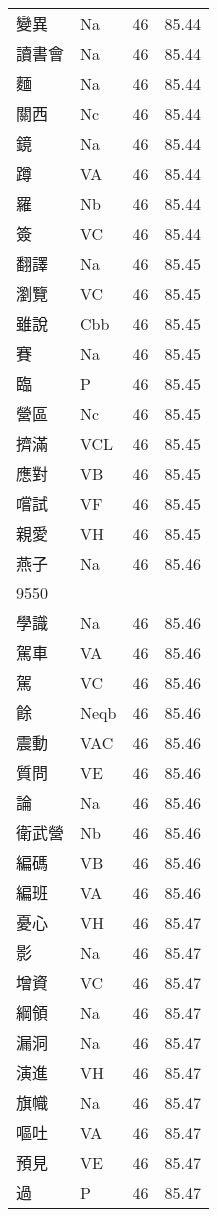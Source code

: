 \documentclass[twocolumn]{book}
\begin{document}
\begin{supertabular}{llrr}
變異 & Na & 46 &  85.44\\
讀書會 & Na & 46 &  85.44\\
麵 & Na & 46 &  85.44\\
關西 & Nc & 46 &  85.44\\
鏡 & Na & 46 &  85.44\\
蹲 & VA & 46 &  85.44\\
羅 & Nb & 46 &  85.44\\
簽 & VC & 46 &  85.44\\
翻譯 & Na & 46 &  85.45\\
瀏覽 & VC & 46 &  85.45\\
雖說 & Cbb & 46 &  85.45\\
賽 & Na & 46 &  85.45\\
臨 & P & 46 &  85.45\\
營區 & Nc & 46 &  85.45\\
擠滿 & VCL & 46 &  85.45\\
應對 & VB & 46 &  85.45\\
嚐試 & VF & 46 &  85.45\\
親愛 & VH & 46 &  85.45\\
燕子 & Na & 46 &  85.46\\
9550\\
學識 & Na & 46 &  85.46\\
駕車 & VA & 46 &  85.46\\
駕 & VC & 46 &  85.46\\
餘 & Neqb & 46 &  85.46\\
震動 & VAC & 46 &  85.46\\
質問 & VE & 46 &  85.46\\
論 & Na & 46 &  85.46\\
衛武營 & Nb & 46 &  85.46\\
編碼 & VB & 46 &  85.46\\
編班 & VA & 46 &  85.46\\
憂心 & VH & 46 &  85.47\\
影 & Na & 46 &  85.47\\
增資 & VC & 46 &  85.47\\
綱領 & Na & 46 &  85.47\\
漏洞 & Na & 46 &  85.47\\
演進 & VH & 46 &  85.47\\
旗幟 & Na & 46 &  85.47\\
嘔吐 & VA & 46 &  85.47\\
預見 & VE & 46 &  85.47\\
過 & P & 46 &  85.47\\

\end{supertabular}
\end{document}
